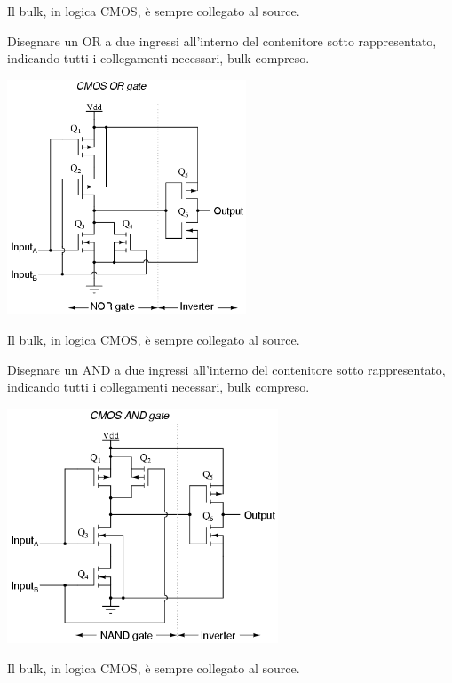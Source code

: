 \documentclass[answers,a4paper,12pt]{exam}
\begin{document}
\begin{questions}
\begin{solutionorbox}[5cm]
{}

Il bulk, in logica CMOS, è sempre collegato al source.
\end{solutionorbox}

\question Disegnare un OR a due ingressi all'interno del contenitore sotto rappresentato, indicando tutti i collegamenti necessari, bulk compreso.
\begin{solutionorbox}[5cm]

    {\centering

    \includegraphics[height=7cm]{CMOSOR.png}

}
Il bulk, in logica CMOS, è sempre collegato al source.
\end{solutionorbox}
\pagebreak
\question Disegnare un AND a due ingressi all'interno del contenitore sotto rappresentato, indicando tutti i collegamenti necessari, bulk compreso.
\begin{solutionorbox}[5cm]

    {\centering

    \includegraphics[height=7cm]{CMOSAND.png}

}
Il bulk, in logica CMOS, è sempre collegato al source.
\end{solutionorbox}


\end{questions}
\end{document}
